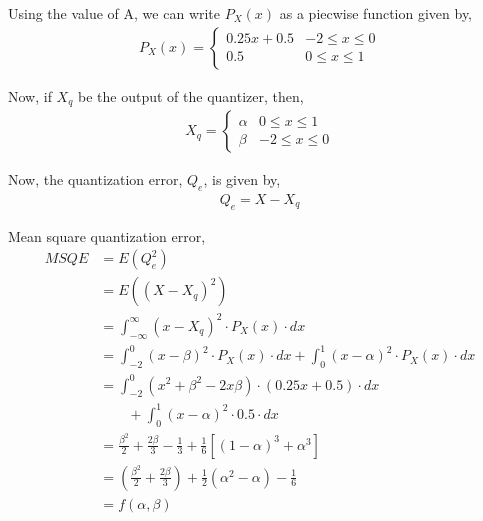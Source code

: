 \documentclass[]{article}
\begin{document}
Using the value of A, we can write $P_X(x)$ as a piecwise function given by,
\begin{align}
    P_X(x) = 
    \begin{cases}
        0.25x + 0.5 & -2\leq x\leq 0 \\
        0.5 & 0\leq x \leq1
    \end{cases}
\end{align}

Now, if $X_q$ be the output of the quantizer, then,
\begin{align}
    X_q = 
    \begin{cases}
        \alpha & 0\leq x \leq1 \\
        \beta & -2\leq x\leq 0
    \end{cases}
\end{align}

Now, the quantization error, $Q_e$, is given by,
\begin{align}
    Q_e = X-X_q
\end{align}

Mean square quantization error, 
\begin{align}
    MSQE &= E(Q_e^2) \\
    &= E((X-X_q)^2) \\
    &= \int_{-\infty}^{\infty}(x-X_q)^2\cdot P_X(x)\cdot dx \\
    &= \int_{-2}^{0}(x-\beta)^2\cdot P_X(x)\cdot dx + \int_{0}^{1}(x-\alpha)^2\cdot P_X(x)\cdot dx \\
    &= \int_{-2}^{0}(x^2+\beta ^2-2x\beta)\cdot (0.25x+0.5)\cdot dx \\ &\qquad + \int_{0}^{1}(x-\alpha)^2\cdot 0.5\cdot dx \\
    &= \frac{\beta ^2}{2} + \frac{2\beta}{3} -\frac{1}{3} + \frac{1}{6}[(1-\alpha)^3+\alpha ^3] \\
    &= (\frac{\beta ^2}{2} + \frac{2\beta}{3}) + \frac{1}{2}(\alpha ^2 - \alpha) - \frac{1}{6} \\
    &= f(\alpha, \beta)
\end{align}
\end{document}
